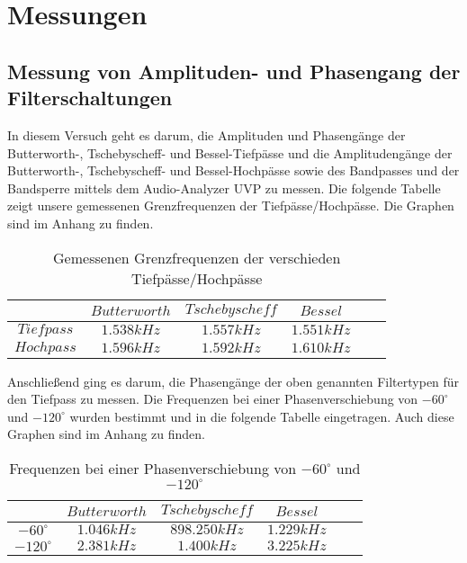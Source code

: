 \section{Messungen}
\subsection{Messung von Amplituden- und Phasengang der Filterschaltungen}
\noindent In diesem Versuch geht es darum, die Amplituden und Phasengänge der Butterworth-, Tschebyscheff- und Bessel-Tiefpässe und die Amplitudengänge der Butterworth-, Tschebyscheff- und Bessel-Hochpässe sowie des Bandpasses und der Bandsperre mittels dem Audio-Analyzer UVP zu messen. Die folgende Tabelle zeigt unsere gemessenen Grenzfrequenzen der Tiefpässe/Hochpässe. Die Graphen sind im Anhang zu finden.

	\begin{table}[h]
		\centering
		\begin{tabular}{c|c|c|c|c|c}
			$ $        & $Butterworth$ & $Tschebyscheff$ & $Bessel$  \\
			\hline
			$Tiefpass$ & $1.538kHz$    & $1.557kHz$      & $1.551kHz$  \\
			$Hochpass$ & $1.596kHz$    & $1.592kHz$      & $1.610kHz$  \\   
		\end{tabular}
		\caption{Gemessenen Grenzfrequenzen der verschieden Tiefpässe/Hochpässe}
		\label{tab:grenzfrequnzen_hp_tp}
	\end{table}
	
\noindent Anschließend ging es darum, die Phasengänge der oben genannten Filtertypen für den Tiefpass zu messen. Die Frequenzen bei einer Phasenverschiebung von $-60^\circ$ und $-120^\circ$ wurden bestimmt und in die folgende Tabelle eingetragen. Auch diese Graphen sind im Anhang zu finden.

\begin{table}[h]
	\centering
		\begin{tabular}{c|c|c|c|c|c}
			$ $           & $Butterworth$ & $Tschebyscheff$ & $Bessel$  \\
			\hline		
		    $-60^\circ $ & $1.046kHz$    & $898.250kHz$    & $1.229kHz$  \\
			$-120^\circ$ & $2.381kHz$    & $1.400kHz$      & $3.225kHz$  \\   
	\end{tabular}
	\caption{Frequenzen bei einer Phasenverschiebung von $-60^\circ$ und $-120^\circ$ }
	\label{tab:phasenverschiebung_hp_tp}
\end{table}
	
